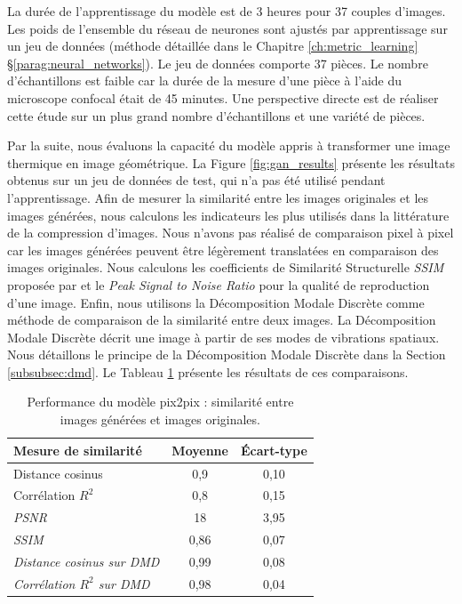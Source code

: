 La durée de l'apprentissage du modèle est de 3 heures pour 37 couples d'images.
Les poids de l'ensemble du réseau de neurones sont ajustés par apprentissage sur un jeu de données (méthode détaillée dans le Chapitre \ref{ch:metric_learning} §\ref{parag:neural_networks}).
Le jeu de données comporte 37 pièces.
Le nombre d'échantillons est faible car la durée de la mesure d'une pièce à l'aide du microscope confocal était de 45 minutes.
Une perspective directe est de réaliser cette étude sur un plus grand nombre d'échantillons et une variété de pièces.

Par la suite, nous évaluons la capacité du modèle appris à transformer une image thermique en image géométrique.
La Figure \ref{fig:gan_results} présente les résultats obtenus sur un jeu de données de test, qui n'a pas été utilisé pendant l'apprentissage.
Afin de mesurer la similarité entre les images originales et les images générées, nous calculons les indicateurs les plus utilisés dans la littérature de la compression d'images.
Nous n'avons pas réalisé de comparaison pixel à pixel car les images générées peuvent être légèrement translatées en comparaison des images originales.
Nous calculons les coefficients de Similarité Structurelle \textit{SSIM} proposée par \citeauthor{wang_image_2004} \cite{wang_image_2004} et le \textit{Peak Signal to Noise Ratio} pour la qualité de reproduction d'une image.
Enfin, nous utilisons la Décomposition Modale Discrète comme méthode de comparaison de la similarité entre deux images.
La Décomposition Modale Discrète décrit une image à partir de ses modes de vibrations spatiaux.
Nous détaillons le principe de la Décomposition Modale Discrète dans la Section \ref{subsubsec:dmd}.
Le Tableau \ref{tab:gan_results} présente les résultats de ces comparaisons.

\begin{table}[tbhp]
	\centering
	\begin{tabular}{|l|c|c|}
		\arrayrulecolor{black}
		\hline
		Mesure de similarité & Moyenne & Écart-type \\
		\hline
		\hline
		Distance cosinus & 0,9 & 0,10 \\ \hline
		\hline
		Corrélation $R^2$ & 0,8 & 0,15 \\ \hline
		\textit{PSNR} & 18 & 3,95 \\ \hline
		\textit{SSIM} & 0,86 & 0,07 \\ \hline
		\hline
		\textit{Distance cosinus sur DMD} & 0,99 & 0,08 \\ \hline
		\textit{Corrélation $R^2$ sur DMD} & 0,98 & 0,04 \\ \hline
	\end{tabular}
	\caption{Performance du modèle pix2pix : similarité entre images générées et images originales.}
	\label{tab:gan_results}
\end{table}

